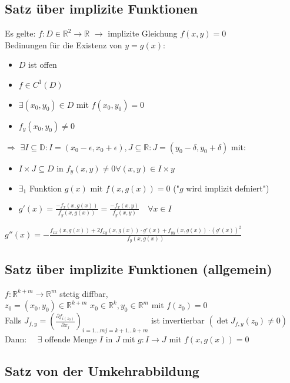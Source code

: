 \documentclass[6pt,a4paper]{scrartcl}
\renewcommand{\emph}[1]{\textbf{#1}}                                                            %
\newcommand{\Ra}[0]{\ensuremath{\Rightarrow}}                                  %
\newcommand{\ra}[0]{\ensuremath{\rightarrow}}                                  %
\begin{document}
\begin{multicols*}{4}
    \subsection{Satz über implizite Funktionen}
    Es gelte: $f: D \in \mathbb R^2 \ra \mathbb R$ \quad
    $\ra $ implizite Gleichung $f(x,y) = 0$ \\
    Bedinungen für die Existenz von $y = g(x)$:
    \begin{itemize} \itemsep0pt
        \item $D$ ist offen
        \item $f \in C^1 (D)$
        \item $\exists (x_0, y_0) \in D$ mit $f(x_0, y_0) = 0$
        \item $f_y(x_0, y_0) \not = 0$
    \end{itemize}
    \emph{$\Ra$} $ \exists I \subseteq \mathbb D: I = (x_0 - \epsilon, x_0 + \epsilon) , J \subseteq \mathbb R: J = (y_0 - \delta, y_0 + \delta)$ mit:
    \begin{itemize}\itemsep0pt
        \item $I \times J \subseteq D$ in $f_y (x,y) \not = 0 \forall (x,y) \in I \times y$
        \item $\exists_1$ Funktion $g(x)$ mit $f(x,g(x)) = 0$ ("$g$ wird implizit defniert")
        \item $g'(x) = \frac{-f_x(x, g(x))}{f_y (x, g(x))} = \frac{-f_x(x, y)}{f_y (x, y)} \quad \forall x \in I$
    \end{itemize}


    $g''(x) = - \frac{f_{xx} (x, g(x)) + 2f_{xy}(x,g(x)) \cdot g'(x) + f_{yy} (x, g(x)) \cdot (g'(x))^2}{f_y (x, g(x))} $

    \subsection{Satz über implizite Funktionen (allgemein)}
    $f: \mathbb R^{k+m} \ra \mathbb R^m$ stetig diffbar,\\ $z_0 = (x_0, y_0) \in \mathbb R^{k+m}$      $x_0 \in \mathbb R^k, y_0 \in \mathbb R^m$ mit $f(z_0) = 0$
    \\
    Falls $J_{f,y} = (\frac{\partial f_{i(z_0)}}{\partial x_j})_{i = 1 \ldots m j= k +1 \ldots k+m}$ ist invertierbar $(\det J_{f,y} (z_0) \not = 0)$
    \\
    Dann: $\quad \exists$ offende Menge $I$ in $J$ mit $g: I \ra J$ mit $f(x,g(x)) = 0$


    \subsection{Satz von der Umkehrabbildung}


\end{multicols*}
\end{document}
